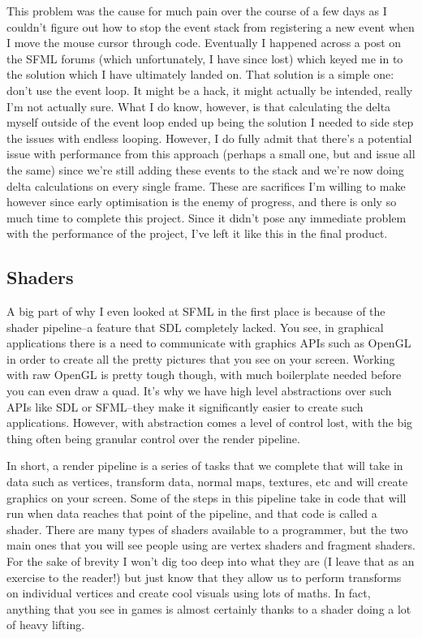 \documentclass{article}
\begin{document}
This problem was the cause for much pain over the course of a few days as I
couldn't figure out how to stop the event stack from registering a new event
when I move the mouse cursor through code. Eventually I happened across a post
on the SFML forums (which unfortunately, I have since lost) which keyed me in to
the solution which I have ultimately landed on. That solution is a simple one:
don't use the event loop. It might be a hack, it might actually be intended,
really I'm not actually sure. What I do know, however, is that calculating the
delta myself outside of the event loop ended up being the solution I needed to
side step the issues with endless looping. However, I do fully admit that
there's a potential issue with performance from this approach (perhaps a small
one, but and issue all the same) since we're still adding these events to the
stack and we're now doing delta calculations on every single frame. These are
sacrifices I'm willing to make however since early optimisation is the enemy of
progress, and there is only so much time to complete this project. Since it
didn't pose any immediate problem with the performance of the project, I've
left it like this in the final product.

\subsection{Shaders}
A big part of why I even looked at SFML in the first place is because of the
shader pipeline--a feature that SDL completely lacked. You see, in graphical
applications there is a need to communicate with graphics APIs such as OpenGL in
order to create all the pretty pictures that you see on your screen. Working
with raw OpenGL is pretty tough though, with much boilerplate needed before you
can even draw a quad. It's why we have high level abstractions over such APIs
like SDL or SFML--they make it significantly easier to create such applications.
However, with abstraction comes a level of control lost, with the big thing
often being granular control over the render pipeline.

In short, a render pipeline is a series of tasks that we complete that will take
in data such as vertices, transform data, normal maps, textures, etc and will
create graphics on your screen. Some of the steps in this pipeline take in code
that will run when data reaches that point of the pipeline, and that code is
called a shader. There are many types of shaders available to a programmer, but
the two main ones that you will see people using are vertex shaders and fragment
shaders. For the sake of brevity I won't dig too deep into what they are (I
leave that as an exercise to the reader!) but just know that they allow us to
perform transforms on individual vertices and create cool visuals using lots of
maths. In fact, anything that you see in games is almost certainly thanks to a
shader doing a lot of heavy lifting.
\end{document}
